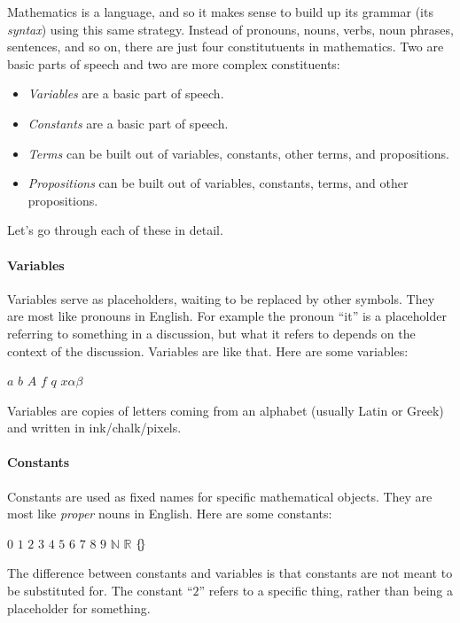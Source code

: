 \documentclass[12pt]{article}
\def\N{\mathbb{N}}
\def\R{\mathbb{R}}
\renewcommand{\emptyset}{\{\hspace{-2pt}\}}
\begin{document}
Mathematics is a language, and so it makes sense to build up its grammar (its \emph{syntax}) using this same strategy.
Instead of pronouns, nouns, verbs, noun phrases, sentences, and so on, there are just four constitutuents in
mathematics. Two are basic parts of speech and two are more complex constituents:
\begin{itemize}
\item \emph{Variables} are a basic part of speech.
\item \emph{Constants} are a basic part of speech.
\item \emph{Terms} can be built out of variables, constants, other terms, and propositions.
\item \emph{Propositions} can be built out of variables, constants, terms, and other propositions.
\end{itemize}

Let's go through each of these in detail.

\def\sp{\hspace{1em}}
\paragraph{Variables}
Variables serve as placeholders, waiting to be replaced by other symbols.
They are most like pronouns in English.
For example the pronoun ``it'' is a placeholder referring to something in a discussion, but what it refers to depends on the context of the discussion.
Variables are like that.
Here are some variables:
\begin{center}
$a$ \sp $b$ \sp $A$ \sp $f$ \sp $q$ \sp $x$\sp $\alpha$\sp $\beta$
\end{center}
Variables are copies of letters coming from an alphabet (usually Latin or Greek) and written in ink/chalk/pixels.



\def\sp{\hspace{1em}}
\paragraph{Constants}
Constants are used as fixed names for specific mathematical objects.
They are most like \emph{proper} nouns in English.
Here are some constants:
\begin{center}
$0$ \sp $1$ \sp $2$ \sp $3$ \sp $4$ \sp $5$ \sp $6$ \sp $7$ \sp $8$ \sp $9$ \sp $\N$ \sp $\R$ \sp $\emptyset$
\end{center}
The difference between constants and variables is that constants are not meant to be substituted for.
The constant ``$2$'' refers to a specific thing, rather than being a placeholder for something.
\end{document}
